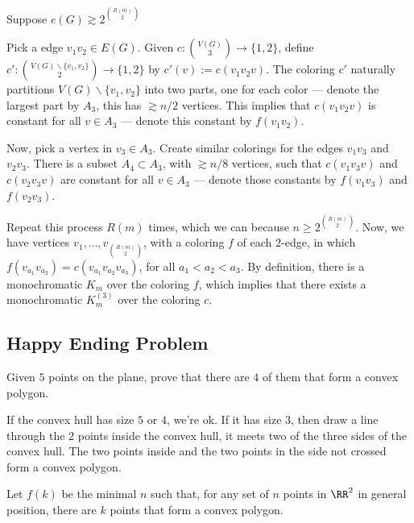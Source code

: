 \begin{sk}[for $k = 3$]
	Suppose $e(G) \gtrsim 2^{\binom{R(m)}{2}}$

	Pick a edge $v_1v_2 \in E(G)$. Given $c \colon \binom{V(G)}{3} \to \{1, 2\}$, define $c' \colon \binom{V(G)\backslash\{v_1, v_2\}}{2} \to \{1, 2\}$ by  $c'(v) := c(v_1v_2v)$. The coloring $c'$ naturally partitions $V(G)\backslash\{v_1, v_2\}$ into two parts, one for each color --- denote the largest part by $A_3$, this has $\gtrsim n/2$ vertices. This implies that $c(v_1v_2v)$ is constant for all $v \in A_3$ --- denote this constant by $f(v_1v_2)$.

	Now, pick a vertex in $v_3 \in A_3$. Create similar colorings for the edges $v_1v_3$ and $v_2v_3$. There is a subset $A_4 \subset A_3$, with $\gtrsim n/8$ vertices, such that $c(v_1v_3v)$ and $c(v_2v_3v)$ are constant for all $v \in A_3$ --- denote those constants by $f(v_1v_3)$ and $f(v_2v_3)$.

	Repeat this process $R(m)$ times, which we can because $n \ge 2^{\binom{R(m)}{2}}$. Now, we have vertices $v_1, \dots, v_{\binom{R(m)}{2}}$, with a coloring $f$ of each $2$-edge, in which $f(v_{a_1}v_{a_2}) = c(v_{a_1}v_{a_2}v_{a_3})$, for all $a_1 < a_2 < a_3$. By definition, there is a monochromatic $K_m$ over the coloring $f$, which implies that there exists a monochromatic $K^{(3)}_m$ over the coloring $c$.
\end{sk}

\subsection{Happy Ending Problem}

\begin{prob}
	Given $5$ points on the plane, prove that there are $4$ of them that form a convex polygon.
\end{prob}

\begin{sol}
	If the convex hull has size $5$ or $4$, we're ok. If it has size $3$, then draw a line through the $2$ points inside the convex hull, it meets two of the three sides of the convex hull. The two points inside and the two points in the side not crossed form a convex polygon.
\end{sol}

\begin{defn}
	Let $f(k)$ be the minimal $n$ such that, for any set of $n$ points in $\RR^2$ in general position, there are $k$ points that form a convex polygon.
\end{defn}

